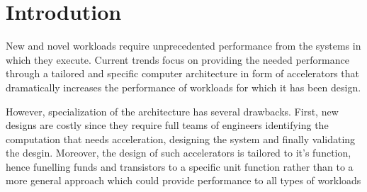 \section{Introdution}

New and novel workloads require unprecedented performance from the systems in which 
they execute. Current trends focus on providing the needed performance through 
a tailored and specific computer architecture in form of accelerators that dramatically increases
the performance of workloads for which it has been design.

However, specialization of the architecture has several drawbacks. First, new
designs are costly since they require full teams of engineers identifying the computation
that needs acceleration, designing the system and finally validating the desgin. Moreover, 
the design of such accelerators is tailored to it's function, hence funelling funds and transistors to
a specific unit function rather than to a more general approach which could provide performance
to all types of workloads



